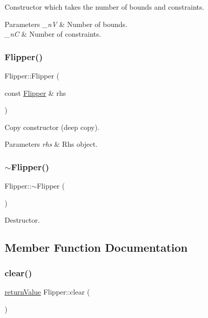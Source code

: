 Constructor which takes the number of bounds and constraints. 
\begin{DoxyParams}{Parameters}
{\em \+\_\+nV} & Number of bounds. \\
\hline
{\em \+\_\+nC} & Number of constraints. \\
\hline
\end{DoxyParams}
\mbox{\label{class_flipper_a710eaed6aa38f0206f0a57331ce0f28d}} 
\subsubsection{\texorpdfstring{Flipper()}{Flipper()}\hspace{0.1cm}{\footnotesize\ttfamily [3/3]}}
{\footnotesize\ttfamily Flipper\+::\+Flipper (\begin{DoxyParamCaption}\item[{const \hyperlink{class_flipper}{Flipper} \&}]{rhs }\end{DoxyParamCaption})}

Copy constructor (deep copy). 
\begin{DoxyParams}{Parameters}
{\em rhs} & Rhs object. \\
\hline
\end{DoxyParams}
\mbox{\label{class_flipper_ae498ab519584627d366565705b5655e3}} 
\subsubsection{\texorpdfstring{$\sim$\+Flipper()}{~Flipper()}}
{\footnotesize\ttfamily Flipper\+::$\sim$\+Flipper (\begin{DoxyParamCaption}{ }\end{DoxyParamCaption})}

Destructor. 

\subsection{Member Function Documentation}
\mbox{\label{class_flipper_a09841cd2ed9e5a18d23b5fd5bf95c211}} 
\subsubsection{\texorpdfstring{clear()}{clear()}}
{\footnotesize\ttfamily \hyperlink{_message_handling_8hpp_a81d556f613bfbabd0b1f9488c0fa865e}{return\+Value} Flipper\+::clear (\begin{DoxyParamCaption}{ }\end{DoxyParamCaption})\hspace{0.3cm}{\ttfamily [protected]}}

